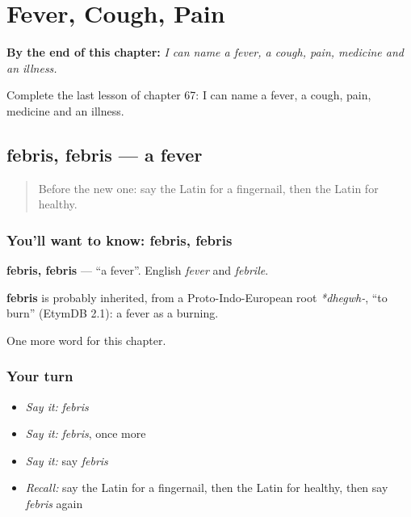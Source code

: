 
\chapter{Fever, Cough, Pain}
\label{ch:la-fever-cough-pain}

\begin{chapteropening}
\textbf{By the end of this chapter:} \emph{I can name a fever, a cough, pain, medicine and an illness.}

Complete the last lesson of chapter 67: I can name a fever, a cough, pain, medicine and an illness.
\end{chapteropening}

\section[febris, febris]{febris, febris — a fever}

\label{lesson:LA-C67-febris}



\begin{quote}
Before the new one: say the Latin for a fingernail, then the Latin for healthy.
\end{quote}

\subsection*{You'll want to know: febris, febris}
\textbf{febris, febris} — \textquotedblleft{}a fever\textquotedblright{}. English \emph{fever} and \emph{febrile}.

\begin{cousinweb}
\textbf{febris} is probably inherited, from a Proto-Indo-European root \emph{*dhegwh-}, \textquotedblleft{}to burn\textquotedblright{} (EtymDB 2.1): a fever as a burning.
\end{cousinweb}

\begin{grammarlens}[title={What you've built}]
One more word for this chapter.
\end{grammarlens}

\subsection*{Your turn}
\begin{itemize}
\raggedright
  \item \emph{Say it:} \emph{febris}
  \item \emph{Say it:} \emph{febris}, once more
  \item \emph{Say it:} say \emph{febris}
  \item \emph{Recall:} say the Latin for a fingernail, then the Latin for healthy, then say \emph{febris} again
\end{itemize}

